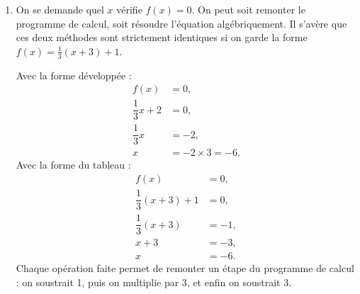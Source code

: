 {\begin{enumerate}
		\begin{align*}	
			f(x) &= \dfrac13(x+3) + 1, \\
				&= \dfrac13 x + \dfrac13 \times 3 + 1, \\
				&= \dfrac13x + 2.
		\end{align*}
		À noter que distribuer $\frac13$ revient à écrire que
			\[  \dfrac{x+3}{3} =  \dfrac{x}{3} +  \dfrac{3}{3}, \]
		qui est une propriété classique des fractions.
		\item
		On se demande quel $x$ vérifie $f(x) = 0$.
		On peut soit remonter le programme de calcul, soit résoudre l'équation algébriquement.
		Il s'avère que ces deux méthodes sont strictement identiques si on garde la forme $f(x) = \frac13(x+3) + 1$.
		
		Avec la forme développée :
			\begin{align*}
				f(x) &= 0, \\
				\dfrac13 x + 2 &= 0, \\
				\dfrac13 x &= - 2, \\
				x &= -2 \times 3 = -6.
			\end{align*}
		Avec la forme du tableau : 
			\begin{align*}
				f(x) &= 0, \\
				\dfrac13 (x+3) + 1 &= 0, \\
				\dfrac13 (x+3) &= - 1, \\
				x+3 &= -3, \\
				x &= - 6.
			\end{align*}
		Chaque opération faite permet de remonter un étape du programme de calcul : on soustrait 1, puis on multiplie par 3, et enfin on soustrait 3.
	\end{enumerate}
}


